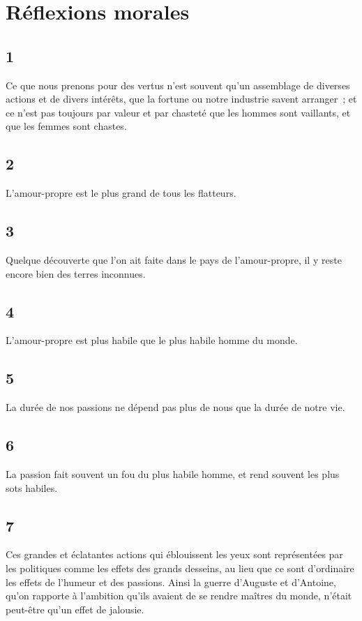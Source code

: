 \documentclass[french,twoside]{book} %
\begin{document}
\section[{Réflexions morales}]{Réflexions morales}\renewcommand{\leftmark}{Réflexions morales}

\subsection[{1}]{ \textsc{1} }
\noindent Ce que nous prenons pour des vertus n’est souvent qu’un assemblage de diverses actions et de divers intérêts, que la fortune ou notre industrie savent arranger ; et ce n’est pas toujours par valeur et par chasteté que les hommes sont vaillants, et que les femmes sont chastes.
\subsection[{2}]{ \textsc{2} }
\noindent L’amour-propre est le plus grand de tous les flatteurs.
\subsection[{3}]{ \textsc{3} }
\noindent Quelque découverte que l’on ait faite dans le pays de l’amour-propre, il y reste encore bien des terres inconnues.
\subsection[{4}]{ \textsc{4} }
\noindent L’amour-propre est plus habile que le plus habile homme du monde.
\subsection[{5}]{ \textsc{5} }
\noindent La durée de nos passions ne dépend pas plus de nous que la durée de notre vie.
\subsection[{6}]{ \textsc{6} }
\noindent La passion fait souvent un fou du plus habile homme, et rend souvent les plus sots habiles.
\subsection[{7}]{ \textsc{7} }
\noindent Ces grandes et éclatantes actions qui éblouissent les yeux sont représentées par les politiques comme les effets des grands desseins, au lieu que ce sont d’ordinaire les effets de l’humeur et des passions. Ainsi la guerre d’Auguste et d’Antoine, qu’on rapporte à l’ambition qu’ils avaient de se rendre maîtres du monde, n’était peut-être qu’un effet de jalousie.
\end{document}
